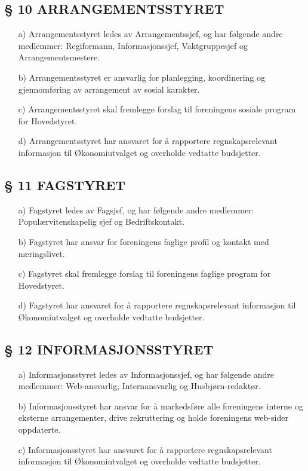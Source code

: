 \subsection*{§ 10 ARRANGEMENTSSTYRET}

\begin{itemize}
\item[a)] Arrangementsstyret ledes av Arrangementssjef, og har følgende andre
medlemmer: Regiformann, Informasjonssjef, Vaktgruppesjef og
Arrangementsmestere.

\item[b)] Arrangementsstyret er ansvarlig for planlegging, koordinering og 
gjennomføring av arrangement av sosial karakter. 

\item[c)] Arrangementsstyret skal fremlegge forslag til foreningens sosiale
program for Hovedstyret.

\item[d)] Arrangementsstyret har ansvaret for å rapportere regnskapsrelevant informasjon til Økonomiutvalget og overholde vedtatte budsjetter.
\end{itemize}


\subsection*{§ 11 FAGSTYRET}

\begin{itemize}
\item[a)] Fagstyret ledes av Fagsjef, og har følgende andre medlemmer:
Populærvitenskapelig sjef og Bedriftskontakt.

\item[b)] Fagstyret har ansvar for foreningens faglige profil og kontakt med
næringslivet.

\item[c)] Fagstyret skal fremlegge forslag til foreningens faglige program
for Hovedstyret.

\item[d)] Fagstyret har ansvaret for å rapportere regnskapsrelevant informasjon til Økonomiutvalget og overholde vedtatte budsjetter.
\end{itemize}


\subsection*{§ 12 INFORMASJONSSTYRET}

\begin{itemize}
\item[a)] Informasjonsstyret ledes av Informasjonssjef, og har følgende andre
medlemmer: Web-ansvarlig, Internansvarlig og Husbjørn-redaktør.
 
\item[b)] Informasjonsstyret har ansvar for å markedsføre alle foreningens
interne og eksterne arrangementer, drive rekruttering og holde
foreningens web-sider oppdaterte.

\item[c)] Informasjonsstyret har ansvaret for å rapportere regnskapsrelevant informasjon til Økonomiutvalget og overholde vedtatte budsjetter.
\end{itemize}


